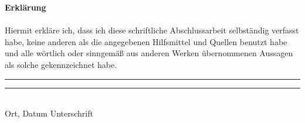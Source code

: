 

\begingroup

\noindent
\textbf{\LARGE Erklärung}\\
\parskip 12pt \\

\noindent
Hiermit erkläre ich, dass ich diese schriftliche Abschlussarbeit selbständig verfasst habe,
keine anderen als die angegebenen Hilfsmittel und Quellen benutzt habe und alle wörtlich
oder sinngemäß aus anderen Werken übernommenen Aussagen als solche gekennzeichnet
habe.

\noindent\rule{3cm}{0.4pt} \hspace{4cm} \rule{4cm}{0.4pt}\\
Ort, Datum \hspace{5cm} Unterschrift


\endgroup

